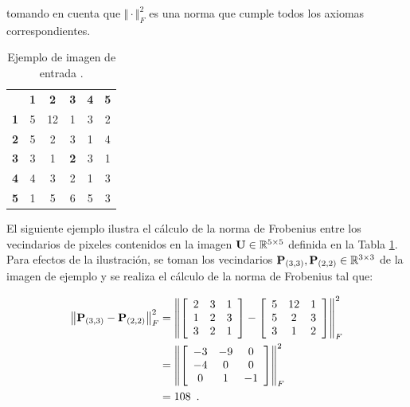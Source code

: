 tomando en cuenta que $\Vert \cdot \Vert_{F}^2$ es una norma que cumple todos los axiomas correspondientes. 

\begin{table}
\begin{center}
\caption{Ejemplo de imagen de entrada .\label{table:imageExample}}

\renewcommand{\arraystretch}{1.4}
\setlength\tabcolsep{3pt}

{
\begin{tabular}{cc|ccc|c}
 & \multicolumn{1}{c}{\textbf{1}} & \textbf{2} & \textbf{3} & \multicolumn{1}{c}{\textbf{4}} & \textbf{5}\tabularnewline
\textbf{1} & \multicolumn{1}{c}{5} & 12 & 1 & \multicolumn{1}{c}{3} & 2\tabularnewline
\cline{3-5} 
\textbf{2} & 5 & 2 & 3 & 1 & 4\tabularnewline
\textbf{3} & 3 & 1 & \textbf{2} & 3 & 1\tabularnewline
\textbf{4} & 4 & 3 & 2 & 1 & 3\tabularnewline
\cline{3-5} 
\textbf{5} & \multicolumn{1}{c}{1} & 5 & 6 & \multicolumn{1}{c}{5} & 3\tabularnewline
\end{tabular}
}
\par\end{center} 
\end{table}

El siguiente ejemplo ilustra el cálculo de la norma de Frobenius entre los vecindarios de pixeles contenidos en la imagen $\mathbf{U} \in\mathbb{R}^{5 \times 5}$ definida en la Tabla \ref{table:imageExample}. Para efectos de la ilustración, se toman los vecindarios $\mathbf{P}_{\left(3,3\right)},\mathbf{P}_{\left(2,2\right)} \in\mathbb{R}^{3\times3}$ de la imagen de ejemplo   y se realiza  el cálculo de la norma de Frobenius tal que:


\begin{equation}
\label{eq:resultado1}
\begin{split}
\left\Vert \mathbf{P}_{\left(3,3\right)}-\mathbf{P}_{\left(2,2\right)}\right\Vert_{F} ^{2} & =\left\Vert \left[\begin{array}{ccc}
2 & 3 & 1\\
1 & 2 & 3\\
3 & 2 & 1
\end{array} \right]-\left[\begin{array}{ccc}
5 & 12 & 1\\
5 & 2 & 3\\
3 & 1 & 2
\end{array}\right]\right\Vert_{F}^2 \\
& =\left\Vert\left[\begin{array}{ccc}
-3 & -9 & 0\\
-4 & 0 & 0\\
0 & 1 & -1
\end{array}\right]\right\Vert_{F}^2 \\
& =108 \enspace .
\end{split}
\end{equation}



